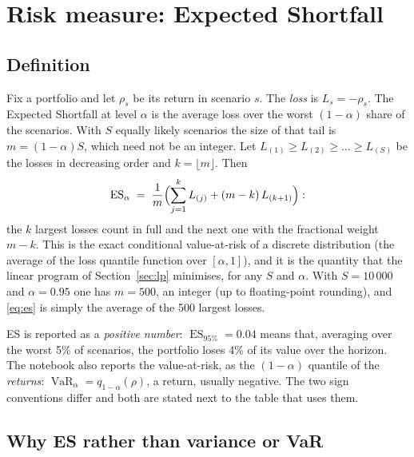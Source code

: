 \documentclass[11pt,a4paper]{article}
\newcommand{\ES}{\operatorname{ES}}
\newcommand{\VaR}{\operatorname{VaR}}
\theoremstyle{plain}
\theoremstyle{remark}
\begin{document}
\section{Risk measure: Expected Shortfall}
\label{sec:es}

\subsection{Definition}

Fix a portfolio and let $\rho_s$ be its return in scenario $s$. The
\emph{loss} is $L_s = -\rho_s$. The Expected Shortfall at level $\alpha$ is
the average loss over the worst $(1-\alpha)$ share of the scenarios. With
$S$ equally likely scenarios the size of that tail is $m = (1-\alpha)S$,
which need not be an integer. Let $L_{(1)} \ge L_{(2)} \ge \dots \ge L_{(S)}$
be the losses in decreasing order and $k = \lfloor m \rfloor$. Then
\begin{equation}
  \ES_\alpha \;=\; \frac{1}{m}\Bigl( \sum_{j=1}^{k} L_{(j)} + (m-k)\,L_{(k+1)} \Bigr):
  \label{eq:es}
\end{equation}
the $k$ largest losses count in full and the next one with the fractional
weight $m - k$. This is the exact conditional value-at-risk of a discrete
distribution (the average of the loss quantile function over $[\alpha,1]$),
and it is the quantity that the linear program of Section~\ref{sec:lp}
minimises, for any $S$ and $\alpha$. With $S = 10\,000$ and $\alpha = 0.95$
one has $m = 500$, an integer (up to floating-point rounding), and
\eqref{eq:es} is simply the average of the
500 largest losses.

ES is reported as a \emph{positive number}: $\ES_{95\%} = 0.04$ means that,
averaging over the worst 5\% of scenarios, the portfolio loses 4\% of its
value over the horizon. The notebook also reports the value-at-risk, as the
$(1-\alpha)$ quantile of the \emph{returns}: $\VaR_\alpha = q_{1-\alpha}(\rho)$,
a return, usually negative. The two sign conventions differ and both are
stated next to the table that uses them.

\subsection{Why ES rather than variance or VaR}
\end{document}
